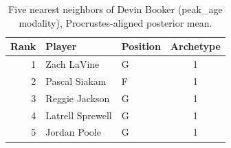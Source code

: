 \begin{table}[htbp]
  \centering\small
  \begin{tabular}{rllc}
    \toprule
    Rank & Player & Position & Archetype \\
    \midrule
    1 & Zach LaVine & G & 1 \\
    2 & Pascal Siakam & F & 1 \\
    3 & Reggie Jackson & G & 1 \\
    4 & Latrell Sprewell & G & 1 \\
    5 & Jordan Poole & G & 1 \\
    \bottomrule
  \end{tabular}
  \caption{Five nearest neighbors of Devin Booker (peak_age modality), Procrustes-aligned posterior mean.}
  \label{tab:Devin_Booker_neighbors_peak_age}
\end{table}

